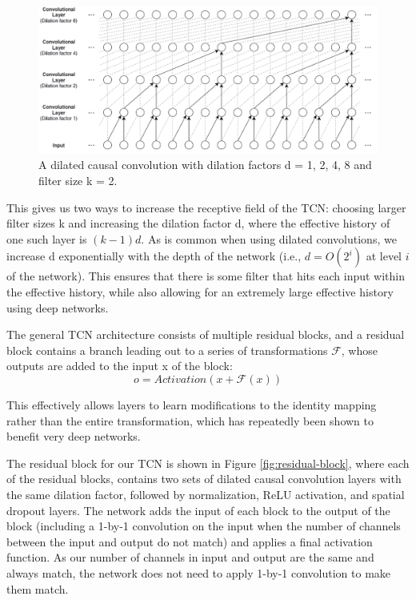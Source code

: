 \documentclass[12pt,a4paper,titlepage,openany]{report}
\begin{document}
\begin{figure}
    \centering
    \includegraphics[width=1\linewidth]{images/Chapter3_Methodology/dilation factor.png}
    \caption{A dilated causal convolution with dilation factors d = 1, 2, 4, 8 and filter size k = 2.}
    \label{fig:dilation-factor}
\end{figure}

This gives us two ways to increase the receptive field of the TCN: choosing larger filter sizes k and increasing the dilation factor d, where the effective history of one such layer is \((k - 1)d\). As is common when using dilated convolutions, we increase d exponentially with the depth of the network (i.e., \(d = O(2^i)\) at level \(i\) of the network). This ensures that there is some filter that hits each input within the effective history, while also allowing for an extremely large effective history using deep networks.

The general TCN architecture consists of multiple residual blocks, and a residual block contains a branch leading out to a series of transformations \(\mathcal{F}\), whose outputs are added to the input x of the block:
\begin{equation}
    o = Activation(x + \mathcal{F}(x))
    \label{eq:activation}
\end{equation}

This effectively allows layers to learn modifications to the identity mapping rather than the entire transformation, which has repeatedly been shown to benefit very deep networks.

The residual block for our TCN is shown in Figure \ref{fig:residual-block}, where each of the residual blocks, contains two sets of dilated causal convolution layers with the same dilation factor, followed by normalization, ReLU activation, and spatial dropout layers. The network adds the input of each block to the output of the block (including a 1-by-1 convolution on the input when the number of channels between the input and output do not match) and applies a final activation function. As our number of channels in input and output are the same and always match, the network does not need to apply 1-by-1 convolution to make them match.
\end{document}
